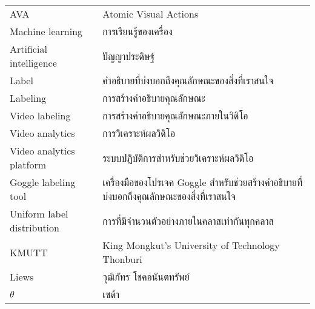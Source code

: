\begin{abbreviations}
    \noindent
    \begin{tabular*}{\textwidth}{@{}p{}p{}@{}}
        {AVA} & {Atomic Visual Actions} \\
        {Machine learning} & {การเรียนรู้ของเครื่อง} \\
        {Artificial intelligence} & {ปัญญาประดิษฐ์} \\
        {Label} & {คำอธิบายที่บ่งบอกถึงคุณลักษณะของสิ่งที่เราสนใจ} \\
        {Labeling} & {การสร้างคำอธิบายคุณลักษณะ} \\
        {Video labeling} & {การสร้างคำอธิบายคุณลักษณะภายในวิดิโอ} \\
        {Video analytics} & {การวิเคราะห์ผลวิดิโอ} \\
	{Video analytics platform} & {ระบบปฎิบัติการสำหรับช่วยวิเคราะห์ผลวิดิโอ} \\
        {Goggle labeling tool} & {เครื่องมือของโปรเจค Goggle สำหรับช่วยสร้างคำอธิบายที่บ่งบอกถึงคุณลักษณะของสิ่งที่เราสนใจ} \\
        {Uniform label distribution} & {การที่มีจำนวนตัวอย่างภายในคลาสเท่ากันทุกคลาส} \\
        {KMUTT} & {King Mongkut's University of Technology Thonburi} \\
        {Liews} & {วุฒิภัทร โชคอนันตทรัพย์} \\
        {$\theta$} & {เซต้า}
    \end{tabular*}
\end{abbreviations}
